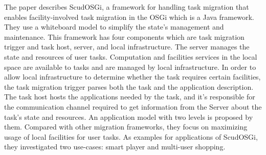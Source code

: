 The paper \cite{r4-5392926} describes ScudOSGi, a framework for handling task migration that enables facility-involved task migration in the OSGi which is a Java framework.
They use a whiteboard model to simplify the state’s management and maintenance.
This framework has four components which are task migration trigger and task host, server, and local infrastructure. 
The server manages the state and resources of user tasks.
Computation and facilities services in the local space are available to tasks and are managed by local infrastructure.
In order to allow local infrastructure to determine whether the task requires certain facilities, the task migration trigger parses both the task and the application description.
The task host hosts the applications needed by the task, and it's responsible for the communication channel required to get information from the Server about the task's state and resources.
An application model with two levels is proposed by them. 
Compared with other migration frameworks, they focus on maximizing usage of local facilities for user tasks.
As examples for applications of ScudOSGi, they investigated two use-cases: smart player and multi-user shopping.

